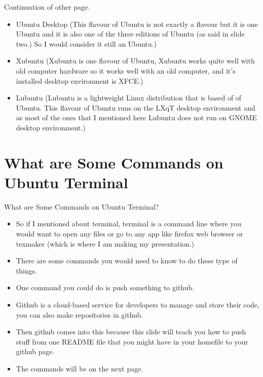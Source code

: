 \documentclass[aspectratio=43]{beamer}
\begin{document}
	
\begin{frame}{Continuation of other page.}
\begin{block}{}
\begin{itemize}

\item Ubuntu Desktop (This flavour of Ubuntu is not exactly a flavour but it is one Ubuntu and it is also one of the three editions of Ubuntu (as said in slide two.) So I would consider it still an Ubuntu.)
\item Xubuntu (Xubuntu is one flavour of Ubuntu, Xubuntu works quite well with old computer hardware so it works well with an old computer, and it's installed desktop environment is XFCE.)
\item Lubuntu (Lubuntu is a lightweight Linux distribution that is based of of Ubuntu. This flavour of Ubuntu runs on the LXqT desktop environment and as most of the ones that I mentioned here Lubuntu does not run on GNOME desktop environment.)

\end{itemize}
\end{block}
\end{frame}


\section{What are Some Commands on Ubuntu Terminal}
\begin{frame}{What are Some Commands on Ubuntu Terminal?}
\begin{itemize}

\item So if I mentioned about terminal, terminal is a command line where you would want to open any files or go to any app like firefox web browser or texmaker (which is where I am making my presentation.)
\item There are some commands you would need to know to do these type of things.
\item One command you could do is push something to github.
\item Github is a cloud-based service for developers to manage and store their code, you can also make repositories in github.
\item Then github comes into this because this slide will teach you how to push stuff from one README file that you might have in your homefile to your github page.
\item The commands will be on the next page.

\end{itemize}
\end{frame}
\end{document}
